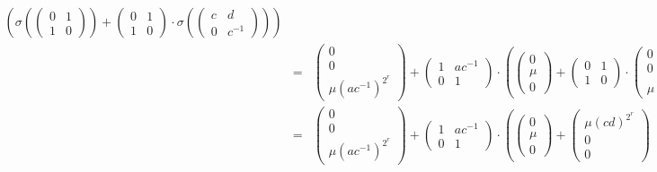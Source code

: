 \begin{eqnarray*}
\left(
	\sigma\left(
		\left(\begin{matrix} 0 & 1 \\ 1 & 0 \end{matrix}\right)
	\right) +
	\left(\begin{matrix} 0 & 1 \\ 1 & 0 \end{matrix}\right)\cdot
	\sigma\left(
		\left(\begin{matrix} c & d \\ 0 & c^{-1} \end{matrix}\right)
	\right)
\right)\\
&=&
\left(\begin{matrix} 0 \\ 0 \\ \mu(ac^{-1})^{2^r} \end{matrix}\right)
 + 
\left(\begin{matrix} 1 & ac^{-1} \\ 0 & 1 \end{matrix}\right)\cdot
\left(
	\left(\begin{matrix} 0 \\ \mu \\ 0 \end{matrix}\right)
	 +
	\left(\begin{matrix} 0 & 1 \\ 1 & 0 \end{matrix}\right)\cdot
	\left(\begin{matrix} 0 \\ 0 \\ \mu(cd)^{2^r} \end{matrix}\right)
\right)
\\
&=&
\left(\begin{matrix} 0 \\ 0 \\ \mu(ac^{-1})^{2^r} \end{matrix}\right)
 + 
\left(\begin{matrix} 1 & ac^{-1} \\ 0 & 1 \end{matrix}\right)\cdot
\left(
	\left(\begin{matrix} 0 \\ \mu \\ 0 \end{matrix}\right)
	 +
	\left(\begin{matrix} \mu(cd)^{2^r} \\ 0 \\ 0 \end{matrix}\right)

\end{eqnarray*}
